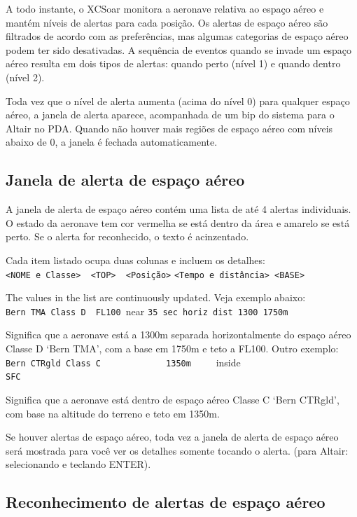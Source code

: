 A todo instante, o XCSoar monitora a aeronave relativa ao espaço aéreo e mantém níveis de alertas para cada posição.  Os alertas de espaço aéreo são filtrados de acordo com as preferências, mas algumas categorias de espaço aéreo podem ter sido desativadas.  
A sequência de eventos quando se invade um espaço aéreo resulta em dois tipos de alertas: quando perto (nível 1) e quando dentro (nível 2).

Toda vez que o nível de alerta aumenta (acima do nível 0) para qualquer espaço aéreo, a janela de alerta aparece, acompanhada de um bip do sistema para o Altair no PDA.  Quando não houver mais regiões de espaço aéreo com níveis abaixo de 0, a janela é fechada automaticamente. 


\subsection*{Janela de alerta de espaço aéreo}

A janela de alerta de espaço aéreo contém uma lista de até 4 alertas individuais.  O estado da aeronave tem cor vermelha se está dentro da área e amarelo se está perto.  Se o alerta for reconhecido, o texto é acinzentado.

Cada item listado ocupa duas colunas e incluem os detalhes:\\
\verb+<NOME e Classe>  <TOP>  <Posição>+ \verb+<Tempo e distância> <BASE>+

The values in the list are continuously updated. 
Veja exemplo abaixo:\\
\verb+Bern TMA Class D  FL100 +\colorbox{AirspaceYellow}{near} 
\verb+35 sec horiz dist 1300 1750m+

Significa que a aeronave está a 1300m separada horizontalmente do espaço aéreo Classe D `Bern TMA', com a base em 1750m e teto a FL100.
Outro exemplo:\\
\verb+Bern CTRgld Class C             1350m     +\colorbox{AirspaceRed}{inside}
\verb+                                SFC+

Significa que a aeronave está dentro de espaço aéreo Classe C `Bern CTRgld', com base na altitude do terreno e teto em 1350m.

Se houver alertas de espaço aéreo, toda vez a janela de alerta de espaço aéreo será mostrada para você ver os detalhes somente tocando o alerta. (para Altair: selecionando e teclando ENTER).

\subsection*{Reconhecimento de alertas de espaço aéreo }

